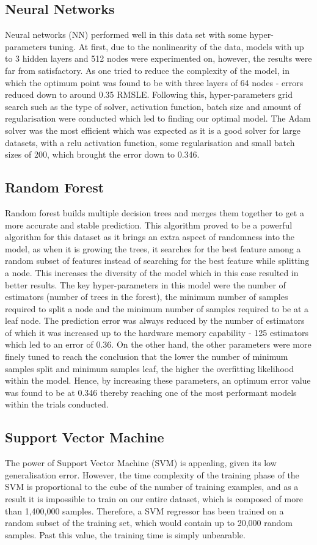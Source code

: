 \documentclass[a4paper]{article}
\begin{document}
\subsection{Neural Networks}
Neural networks (NN) performed well in this data set with some hyper-parameters
tuning. At first, due to the nonlinearity of the data, models with up to 3
hidden layers and 512 nodes were experimented on, however, the results were far
from satisfactory. As one tried to reduce the complexity of the model, in which
the optimum point was found to be with three layers of 64 nodes - errors reduced
down to around 0.35 RMSLE. Following this, hyper-parameters grid search such as
the type of solver, activation function, batch size and amount of regularisation
were conducted which led to finding our optimal model. The Adam solver was the
most efficient which was expected as it is a good solver for large datasets,
with a relu activation function, some regularisation and small batch sizes of
200, which brought the error down to 0.346.

\subsection{Random Forest}
Random forest builds multiple decision trees and merges them together to get a
more accurate and stable prediction. This algorithm proved to be a powerful
algorithm for this dataset as it brings an extra aspect of randomness into the
model, as when it is growing the trees, it searches for the best feature among a
random subset of features instead of searching for the best feature while
splitting a node. This increases the diversity of the model which in this case
resulted in better results. The key hyper-parameters in this model were the
number of estimators (number of trees in the forest), the minimum number of
samples required to split a node and the minimum number of samples required to
be at a leaf node. The prediction error was always reduced by the number of
estimators of which it was increased up to the hardware memory capability - 125
estimators which led to an error of 0.36. On the other hand, the other
parameters were more finely tuned to reach the conclusion that the lower the
number of minimum samples split and minimum samples leaf, the higher the
overfitting likelihood within the model. Hence, by increasing these parameters,
an optimum error value was found to be at 0.346 thereby reaching one of the most
performant models within the trials conducted.

\subsection{Support Vector Machine}
The power of Support Vector Machine (SVM) is appealing, given its low
generalisation error. However, the time complexity of the training phase of the
SVM is proportional to the cube of the number of training examples, and as a
result it is impossible to train on our entire dataset, which is composed of
more than 1,400,000 samples. Therefore, a SVM regressor has been trained on a
random subset of the training set, which would contain up to 20,000 random
samples. Past this value, the training time is simply unbearable.
\end{document}
